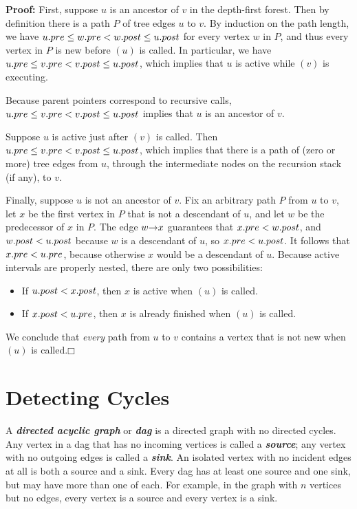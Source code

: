 \medskip
\noindent\textbf{Proof:} First, suppose $u$ is an ancestor of $v$ in the depth-first forest.
Then by definition there is a path $P$ of tree edges $u$ to $v$.
By induction on the path length, we have $u.pre \le w.pre < w.post \le u.post$ for every vertex $w$ in $P$, and thus every vertex in $P$ is new before $(u)$ is called.
In particular, we have $u.pre \le v.pre < v.post \le u.post$, which implies that $u$ is active while $(v)$ is executing.

Because parent pointers correspond to recursive calls, $u.pre \le v.pre < v.post \le u.post$ implies that $u$ is an ancestor of $v$.

Suppose $u$ is active just after $(v)$ is called.
Then $u.pre \le v.pre < v.post \le u.post$, which implies that there is a path of (zero or more) tree edges from $u$, through the intermediate nodes on the recursion stack (if any), to $v$.

Finally, suppose $u$ is not an ancestor of $v$.
Fix an arbitrary path $P$ from $u$ to $v$, let $x$ be the first vertex in $P$ that is not a descendant of $u$, and let $w$ be the predecessor of $x$ in $P$.
The edge $w\mathord{\rightarrow}x$ guarantees that $x.pre < w.post$, and $w.post < u.post$ because $w$ is a descendant of $u$, so $x.pre < u.post$.
It follows that $x.pre < u.pre$, because otherwise $x$ would be a descendant of $u$.
Because active intervals are properly nested, there are only two possibilities:
\begin{itemize}
\item If $u.post < x.post$, then $x$ is active when $(u)$ is called.
\item If $x.post < u.pre$, then $x$ is already finished when $(u)$ is called.
\end{itemize}
We conclude that \textit{every} path from $u$ to $v$ contains a vertex that is not new when $(u)$ is called.\hfill$\mdlgwhtsquare$

\section{Detecting Cycles}
\label{sec:6.2}

A \textbf{\textit{directed acyclic graph}} or \textbf{\textit{dag}} is a directed graph with no directed cycles.
Any vertex in a dag that has no incoming vertices is called a \textbf{\textit{source}}; any vertex with no outgoing edges is called a \textbf{\textit{sink}}.
An isolated vertex with no incident edges at all is both a source and a sink.
Every dag has at least one source and one sink, but may have more than one of each.
For example, in the graph with $n$ vertices but no edges, every vertex is a source and every vertex is a sink.


